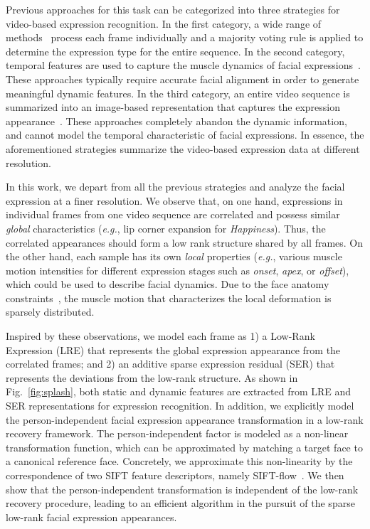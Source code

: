 \documentclass[journal]{IEEEtran}
\begin{document}
Previous approaches for this task can be categorized into three strategies for video-based expression recognition. In the first category, a wide range of methods~\cite{Bartlett_FG11,Valstar_SMCB12} process each frame individually and a majority voting rule is applied to determine the expression type for the entire sequence. In the second category, temporal features are used to capture the muscle dynamics of facial expressions~\cite{Zhao_PAMI07,Huang11}. These approaches typically require accurate facial alignment in order to generate meaningful dynamic features. In the third category, an entire video sequence is summarized into an image-based representation that captures the expression appearance~\cite{Yang_SMCB12,Dahmane_TMM14}. These approaches completely abandon the dynamic information, and cannot model the temporal characteristic of facial expressions. In essence, the aforementioned strategies summarize the video-based expression data at different resolution. 

In this work, we depart from all the previous strategies and analyze the facial expression at a finer resolution. We observe that, on one hand, expressions in individual frames from one video sequence are correlated and possess similar \textit{global} characteristics (\textit{e.g.}, lip corner expansion for \textit{Happiness}). Thus, the correlated appearances should form a low rank structure shared by all frames. On the other hand, each sample has its own \textit{local} properties (\textit{e.g.}, various muscle motion intensities for different expression stages such as \textit{onset}, \textit{apex}, or \textit{offset}), which could be used to describe facial dynamics. Due to the face anatomy constraints~\cite{Ekman78}, the muscle motion that characterizes the local deformation is sparsely distributed. 

Inspired by these observations, we model each frame as 1) a Low-Rank Expression (LRE) that represents the global expression appearance from the correlated frames; and 2) an additive sparse expression residual (SER) that represents the deviations from the low-rank structure. As shown in Fig.~\ref{fig:splash}, both static and dynamic features are extracted from LRE and SER representations for expression recognition. In addition, we explicitly model the person-independent facial expression appearance transformation in a low-rank recovery framework. The person-independent factor is modeled as a non-linear transformation function, which can be approximated by matching a target face to a canonical reference face. Concretely, we approximate this non-linearity by the correspondence of two SIFT feature descriptors, namely SIFT-flow~\cite{Liu_PAMI11}. We then show that the person-independent transformation is independent of the low-rank recovery procedure, leading to an efficient algorithm in the pursuit of the sparse low-rank facial expression appearances. 
\end{document}

